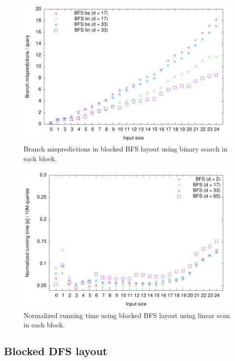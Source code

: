 \begin{figure}[h!]

  \centering
  \includegraphics[width=\textwidth]{../week1/plots/outputs/Btree_branchmis}
  \caption{Branch mispredictions in blocked BFS layout using binary search in each block.}
  \label{fig:blocked_bfs_branchmis_runningtime}
\end{figure}

\begin{figure}[h!]

  \centering
  \includegraphics[width=\textwidth]{../week1/plots/outputs/Btree_lin_runningtime}
  \caption{Normalized running time using blocked BFS layout using linear scan in each block.}
  \label{fig:blocked_bfs_lin_runningtime}
\end{figure}

\subsection{Blocked DFS layout}

